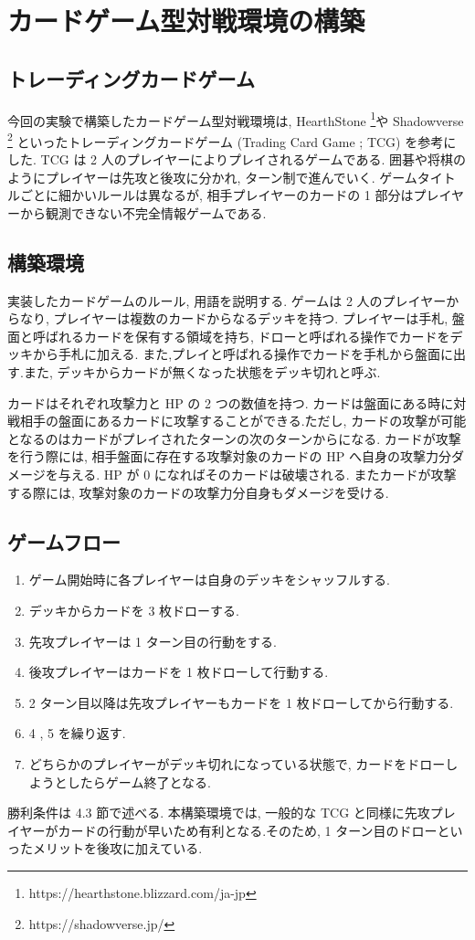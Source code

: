 \documentclass[twocolumn]{jarticle}     %
\begin{document}
\section{カードゲーム型対戦環境の構築}
\subsection{トレーディングカードゲーム}
今回の実験で構築したカードゲーム型対戦環境は, HearthStone \footnote[1]{https://hearthstone.blizzard.com/ja-jp}や Shadowverse \footnote[2]{https://shadowverse.jp/} といったトレーディングカードゲーム (Trading Card Game ; TCG) を参考にした. TCG は 2 人のプレイヤーによりプレイされるゲームである. 囲碁や将棋のようにプレイヤーは先攻と後攻に分かれ, ターン制で進んでいく. 
ゲームタイトルごとに細かいルールは異なるが, 相手プレイヤーのカードの 1 部分はプレイヤーから観測できない不完全情報ゲームである.

\subsection{構築環境}
実装したカードゲームのルール, 用語を説明する.
ゲームは 2 人のプレイヤーからなり, プレイヤーは複数のカードからなるデッキを持つ.
プレイヤーは手札, 盤面と呼ばれるカードを保有する領域を持ち, ドローと呼ばれる操作でカードをデッキから手札に加える. また,プレイと呼ばれる操作でカードを手札から盤面に出す.また, デッキからカードが無くなった状態をデッキ切れと呼ぶ.
\par
カードはそれぞれ攻撃力と HP の 2 つの数値を持つ. カードは盤面にある時に対戦相手の盤面にあるカードに攻撃することができる.ただし, カードの攻撃が可能となるのはカードがプレイされたターンの次のターンからになる. カードが攻撃を行う際には, 相手盤面に存在する攻撃対象のカードの HP へ自身の攻撃力分ダメージを与える. HP が 0 になればそのカードは破壊される. またカードが攻撃する際には, 攻撃対象のカードの攻撃力分自身もダメージを受ける.

\subsection{ゲームフロー}
\begin{enumerate}
  \setlength{\itemsep}{0cm} %
  \item ゲーム開始時に各プレイヤーは自身のデッキをシャッフルする.
  \item デッキからカードを 3 枚ドローする.
  \item 先攻プレイヤーは 1 ターン目の行動をする.
  \item 後攻プレイヤーはカードを 1 枚ドローして行動する.
  \item 2 ターン目以降は先攻プレイヤーもカードを 1 枚ドローしてから行動する.
  \item 4 , 5 を繰り返す.
  \item どちらかのプレイヤーがデッキ切れになっている状態で, カードをドローしようとしたらゲーム終了となる.
\end{enumerate}
勝利条件は 4.3 節で述べる.
本構築環境では, 一般的な TCG と同様に先攻プレイヤーがカードの行動が早いため有利となる.そのため, 1 ターン目のドローといったメリットを後攻に加えている. 
\end{document}
